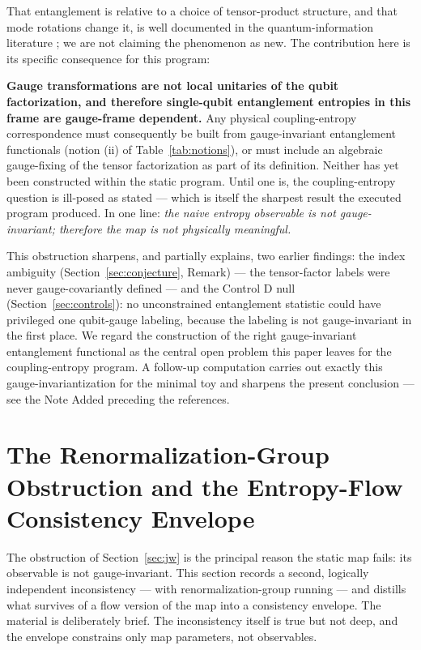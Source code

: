 \documentclass[11pt]{article}
\begin{document}
That entanglement is relative to a choice of tensor-product structure, and that mode rotations change it, is well documented in the quantum-information literature \cite{zanardi, barnum}; we are not claiming the phenomenon as new. The contribution here is its specific consequence for this program:

\textbf{Gauge transformations are not local unitaries of the qubit factorization, and therefore single-qubit entanglement entropies in this frame are gauge-frame dependent.} Any physical coupling-entropy correspondence must consequently be built from gauge-invariant entanglement functionals (notion (ii) of Table~\ref{tab:notions}), or must include an algebraic gauge-fixing of the tensor factorization as part of its definition. Neither has yet been constructed within the static program. Until one is, the coupling-entropy question is ill-posed as stated --- which is itself the sharpest result the executed program produced. In one line: \emph{the naive entropy observable is not gauge-invariant; therefore the map is not physically meaningful.}

This obstruction sharpens, and partially explains, two earlier findings: the index ambiguity (Section~\ref{sec:conjecture}, Remark) --- the tensor-factor labels were never gauge-covariantly defined --- and the Control D null (Section~\ref{sec:controls}): no unconstrained entanglement statistic could have privileged one qubit-gauge labeling, because the labeling is not gauge-invariant in the first place. We regard the construction of the right gauge-invariant entanglement functional as the central open problem this paper leaves for the coupling-entropy program. A follow-up computation carries out exactly this gauge-invariantization for the minimal toy and sharpens the present conclusion --- see the Note Added preceding the references.

\section{The Renormalization-Group Obstruction and the Entropy-Flow Consistency Envelope}
\label{sec:rg}

The obstruction of Section~\ref{sec:jw} is the principal reason the static map fails: its observable is not gauge-invariant. This section records a second, logically independent inconsistency --- with renormalization-group running --- and distills what survives of a flow version of the map into a consistency envelope. The material is deliberately brief. The inconsistency itself is true but not deep, and the envelope constrains only map parameters, not observables.
\end{document}
